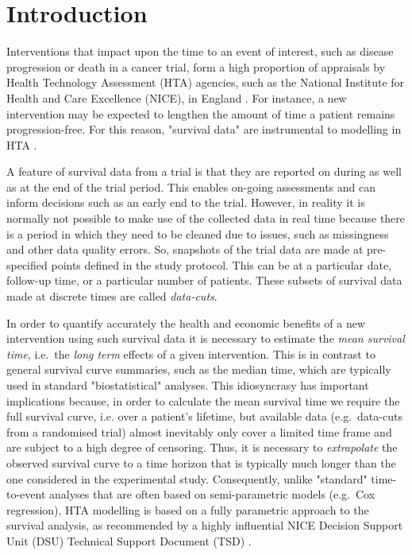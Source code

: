 \documentclass[AMA,STIX1COL]{WileyNJD-v2}
\begin{document}

\section{Introduction}\label{sec:intro}
Interventions that impact upon the time to an event of interest, such as disease progression or death in a cancer trial, form a high proportion of appraisals by Health Technology Assessment (HTA) agencies, such as the National Institute for Health and Care Excellence (NICE), in England \citep{Latimer2011}.
For instance, a new intervention may be expected to lengthen the amount of time a patient remains progression-free. For this reason, "survival data" are instrumental to modelling in HTA \cite{Demiris2006, Jackson2010}.

A feature of survival data from a trial is that they are reported on during as well as at the end of the trial period.
This enables on-going assessments and can inform decisions such as an early end to the trial.
However, in reality it is normally not possible to make use of the collected data in real time because there is a period in which they need to be cleaned due to issues, such as missingness and other data quality errors.
So, snapshots of the trial data are made at pre-specified points defined in the study protocol.
This can be at a particular date, follow-up time, or a particular number of patients.
These subsets of survival data made at discrete times are called \textit{data-cuts}.

In order to quantify accurately the health and economic benefits of a new intervention using such survival data it is necessary to estimate the {\it mean survival time}, i.e.~the \textit{long term} effects of a given intervention.
This is in contrast to general survival curve summaries, such as the median time, which are typically used in standard "biostatistical" analyses.
This idiosyncrasy has important implications because, in order to calculate the mean survival time we require the full survival curve, i.e. over a patient's lifetime, but available data (e.g.~data-cuts from a randomised trial) almost inevitably only cover a limited time frame and are subject to a high degree of censoring.
Thus, it is necessary to \textit{extrapolate} the observed survival curve to a time horizon that is typically much longer than the one considered in the experimental study.
Consequently, unlike "standard" time-to-event analyses that are often based on semi-parametric models (e.g.~Cox regression), HTA modelling is based on a fully parametric approach to the survival analysis, as recommended by a highly influential NICE Decision Support Unit (DSU) Technical Support Document (TSD) \citep{Latimer2011}.
\end{document}
